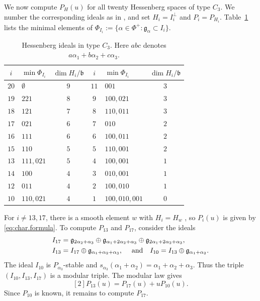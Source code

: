 \documentclass[11pt]{amsart}
\numberwithin{equation}{section}
\theoremstyle{definition}
\def\and{\quad{\rm and}\quad}
\def\beq{\begin{equation}}
\def\eeq{\end{equation}}
\begin{document}
\smallskip
We now compute $P_H(u)$ for all twenty Hessenberg spaces of type $C_3$.
We number the corresponding ideals as in \cite[Section~8]{PS}, and set $H_i=I_i^\perp$ and $P_i=P_{H_i}$.
Table~\ref{tab:C3.ideals} lists the minimal elements of $\Phi_{I_i}:=\{\alpha\in\Phi^+:\mathfrak g_\alpha\subset I_i\}$.


\begin{table}[H]
\centering
\small
\renewcommand{\arraystretch}{1.2}
\begin{tabular}{@{}clc@{\qquad}clc@{}}
\toprule
$i$ & $\min\Phi_{I_i}$ & $\dim H_i/\mathfrak b$ &
$i$ & $\min\Phi_{I_i}$ & $\dim H_i/\mathfrak b$\\
\midrule
$20$ & $\emptyset$ & $9$ & $11$ & $001$ & $3$\\
$19$ & $221$ & $8$ & $9$ & $100,021$ & $3$\\
$18$ & $121$ & $7$ & $8$ & $110,011$ & $3$\\
$17$ & $021$ & $6$ & $7$ & $010$ & $2$\\
$16$ & $111$ & $6$ & $6$ & $100,011$ & $2$\\
$15$ & $110$ & $5$ & $5$ & $110,001$ & $2$\\
$13$ & $111,021$ & $5$ & $4$ & $100,001$ & $1$\\
$14$ & $100$ & $4$ & $3$ & $010,001$ & $1$\\
$12$ & $011$ & $4$ & $2$ & $100,010$ & $1$\\
$10$ & $110,021$ & $4$ & $1$ & $100,010,001$ & $0$\\
\bottomrule
\end{tabular}
\par
\vspace{8pt}
\caption{Hessenberg ideals in type $C_3$.
Here $abc$ denotes $a\alpha_1+b\alpha_2+c\alpha_3$.}
\label{tab:C3.ideals}
\end{table}


For $i\neq13,17$, there is a smooth element $w$ with $H_i=H_w$ \cite[Example~5.6]{BHL25}, so $P_i(u)$ is given by \eqref{eq:char.formula}.
To compute $P_{13}$ and $P_{17}$, consider the ideals
\[
\begin{split}
I_{17}&=\mathfrak g_{2\alpha_2+\alpha_3}
 \oplus\mathfrak g_{\alpha_1+2\alpha_2+\alpha_3}
 \oplus\mathfrak g_{2\alpha_1+2\alpha_2+\alpha_3},\\
I_{13}&=I_{17}\oplus\mathfrak g_{\alpha_1+\alpha_2+\alpha_3},\;\and
I_{10}=I_{13}\oplus\mathfrak g_{\alpha_1+\alpha_2}.
\end{split}
\]
The ideal $I_{10}$ is $P_{\alpha_3}$-stable and
$s_{\alpha_3}(\alpha_1+\alpha_2)=\alpha_1+\alpha_2+\alpha_3$.
Thus the triple $(I_{10},I_{13},I_{17})$ is a modular triple. The modular law gives
\beq\label{eq:C3.modular.law}
[2]P_{13}(u)=P_{17}(u)+uP_{10}(u).
\eeq
Since $P_{10}$ is known, it remains to compute $P_{17}$.
\end{document}
